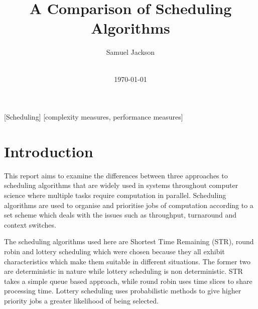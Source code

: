\documentclass{acm_proc_article-sp}
\begin{document}
\title{A Comparison of Scheduling Algorithms}
\author{
\alignauthor
Samuel Jackson\\
       \\
}
\date{\today}

\maketitle
\begin{abstract}

\end{abstract}

[Scheduling]
[complexity measures, performance measures]



\section{Introduction}
This report aims to examine the differences between three approaches to scheduling algorithms that are widely used in systems throughout computer science where multiple tasks require computation in parallel. Scheduling algorithms are used to organise and prioritise jobs of computation according to a set scheme which deals with the issues such as throughput, turnaround and context switches.

The scheduling algorithms used here are Shortest Time Remaining (STR), round robin and lottery scheduling which were chosen because they all exhibit characteristics which make them suitable in different situations. The former two are deterministic in nature while lottery scheduling is non deterministic. STR takes a simple queue based approach, while round robin uses time slices to share processing time. Lottery scheduling uses probabilistic methods to give higher priority jobs a greater likelihood of being selected.
\end{document}
